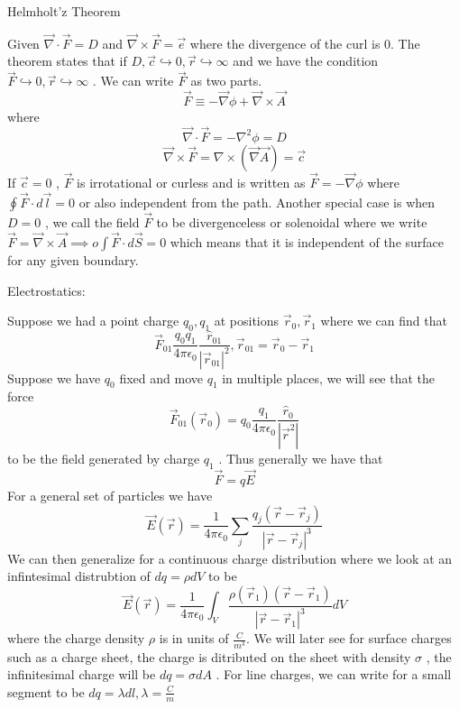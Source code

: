 \begin{theorem}
    Helmholt'z Theorem

    Given \( \vec{\nabla} \cdot \vec{F}  = D\) and \(\vec{\nabla} \times \vec{F}  = \vec{e} \) where the divergence of the curl is 0. 
    The theorem states that if \(D , \vec{c}  \hookrightarrow 0, \vec{r} \hookrightarrow \infty\)   and we have the condition 
    \(\vec{F}  \hookrightarrow  0, \vec{r}  \hookrightarrow  \infty \) . We can write \(\vec{F} \)  as two parts. 
    \[
         \vec{F} \equiv - \vec{\nabla} \phi  + \vec{\nabla}  \times \vec{A} 
    \] 
    where 
    \[
        \vec{\nabla} \cdot \vec{F}  = - \nabla ^{2}  \phi  = D
    \]
    \[
        \vec{\nabla} \times \vec{F}  = \nabla \times (\vec{\nabla}  \vec{A} ) = \vec{c} 
    \]
    If \(\vec{c} =0 \) , \( \vec{F} \)  is irrotational or curless and is written as \( \vec{F}  = - \vec{\nabla}  \phi \) 
    where \( \oint  \vec{F}  \cdot d \vec{l}  = 0 \) or also independent from the path. Another special case is when \(D= 0\) , we call the field 
    \( \vec{F} \)  to be divergenceless or solenoidal where we write \(\vec{F}  = \vec{\nabla} \times \vec{A} \implies  
    o\int  \vec{F} \cdot d \vec{S}  = 0\) which means that  it is independent of the surface for any given boundary. 

\end{theorem}

\begin{remark}
    Electrostatics: 

    Suppose we had a point charge \(q_0, q_1 \) at positions \( \vec{r} _0, \vec{r} _1 \)  where we can find that 
    \[
        \vec{F}_{01}  \frac{q_0 q_1}{4\pi \epsilon _0} \frac{\hat{r}_{01} }{|\vec{r}_{01}|^{2}}  , \vec{r}_{01}  = \vec{r} _0 - \vec{r} _1
    \]
    Suppose we have \(q_0\) fixed and move \(q_1\) in multiple places, we will see that the force 
    \[
        \vec{F}_{01}(\vec{r} _0) = q_0 \frac{q_1}{4\pi \epsilon _0} \frac{\hat{r}_0}{|\vec{r} ^{2} |}
    \]
    to be the field generated by charge \(q_1\) . Thus generally we have that 
    \[
        \vec{F}  = q \vec{E} 
    \]
    For a general set of particles we have
    \[
        \vec{E} (\vec{r} ) = \frac{1}{4 \pi  \epsilon _0} \sum_{j} \frac{q_j(\vec{r} - \vec{r} _j)}{|\vec{r}  - \vec{r} _j|^{3} }
    \]
    We can then generalize for a continuous charge distribution where we look at an infintesimal distrubtion of 
    \(dq = \rho dV\)  to be 
    \[
        \vec{E} (\vec{r} ) = \frac{1}{4\pi \epsilon _0} \int _V \frac{\rho (\vec{r} _1) (\vec{r} -\vec{r} _1)}{|\vec{r} -\vec{r} _1|^3} dV
    \]
    where the charge density \(\rho \) is in units of \(\frac{C}{m^3}\). We will later see for surface charges such as a charge sheet, 
    the charge is ditributed on the sheet with density \(\sigma \) , the infinitesimal charge  will be \(dq = \sigma  dA\) . 
    For line charges, we can write for a small segment to be \(dq = \lambda dl , \lambda   = \frac{C}{m}\) 
\end{remark}

